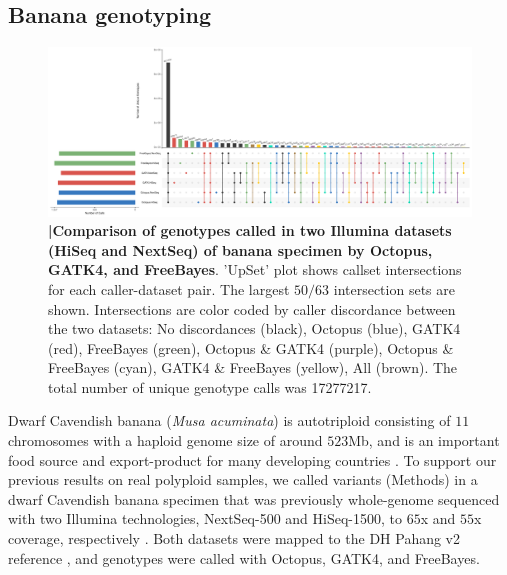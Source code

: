 \documentclass[notitlepage, twocolumn, 10pt]{article}
\begin{document}

\subsection*{Banana genotyping}

\begin{figure}[tp]
	\centering
    \includegraphics[width=\textwidth,height=0.4\textwidth]{figures/banana_intersection}
    \caption{\textbf{|\:Comparison of genotypes called in two Illumina datasets (HiSeq and NextSeq) of banana specimen by Octopus, GATK4, and FreeBayes}. 'UpSet' plot shows callset intersections for each caller-dataset pair. The largest $50/63$ intersection sets are shown. Intersections are color coded by caller discordance between the two datasets: No discordances (black), Octopus (blue), GATK4 (red), FreeBayes (green), Octopus \& GATK4 (purple), Octopus \& FreeBayes (cyan), GATK4 \& FreeBayes (yellow), All (brown). The total number of unique genotype calls was \num[group-separator={,}]{17277217}.}
    \label{fig:banana_intersection}
\end{figure}

Dwarf Cavendish banana (\textit{Musa acuminata}) is autotriploid consisting of $11$ chromosomes with a haploid genome size of around $523$Mb, and is an important food source and export-product for many developing countries \cite{RN671}. To support our previous results on real polyploid samples, we called variants (Methods) in a dwarf Cavendish banana specimen that was previously whole-genome sequenced with two Illumina technologies, NextSeq-500 and HiSeq-1500, to $65$x and $55$x coverage, respectively \cite{RN670}. Both datasets were mapped to the DH Pahang v2 reference \cite{RN671}, and genotypes were called with Octopus, GATK4, and FreeBayes.
\end{document}
